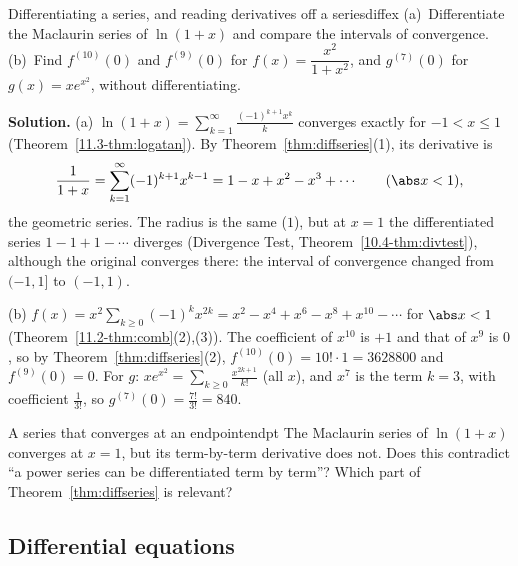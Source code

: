 \documentclass[11pt]{article}
\begin{document}
\begin{exmp}{Differentiating a series, and reading derivatives off a series}{diffex}
(a)~Differentiate the Maclaurin series of $\ln(1+x)$ and compare the intervals of convergence. (b)~Find $f^{(10)}(0)$ and $f^{(9)}(0)$ for $f(x)=\dfrac{x^2}{1+x^2}$, and $g^{(7)}(0)$ for $g(x)=xe^{x^2}$, without differentiating.

\textbf{Solution.} (a) $\ln(1+x)=\sum_{k=1}^\infty\frac{(-1)^{k+1}x^k}k$ converges exactly for $-1<x\le1$ (Theorem~\ref{11.3-thm:logatan}). By Theorem~\ref{thm:diffseries}(1), its derivative is
\[
\frac1{1+x}=\sum_{k=1}^\infty(-1)^{k+1}x^{k-1}=1-x+x^2-x^3+\cdots\qquad(\abs x<1),
\]
the geometric series. The radius is the same ($1$), but at $x=1$ the differentiated series $1-1+1-\cdots$ diverges (Divergence Test, Theorem~\ref{10.4-thm:divtest}), although the original converges there: the interval of convergence changed from $(-1,1]$ to $(-1,1)$.

(b) $f(x)=x^2\sum_{k\ge0}(-1)^kx^{2k}=x^2-x^4+x^6-x^8+x^{10}-\cdots$ for $\abs x<1$ (Theorem~\ref{11.2-thm:comb}(2),(3)). The coefficient of $x^{10}$ is $+1$ and that of $x^9$ is $0$, so by Theorem~\ref{thm:diffseries}(2), $f^{(10)}(0)=10!\cdot1=3628800$ and $f^{(9)}(0)=0$. For $g$: $xe^{x^2}=\sum_{k\ge0}\frac{x^{2k+1}}{k!}$ (all $x$), and $x^7$ is the term $k=3$, with coefficient $\frac1{3!}$, so $g^{(7)}(0)=\frac{7!}{3!}=840$.
\end{exmp}

\begin{think}{A series that converges at an endpoint}{endpt}
The Maclaurin series of $\ln(1+x)$ converges at $x=1$, but its term-by-term derivative does not. Does this contradict ``a power series can be differentiated term by term''? Which part of Theorem~\ref{thm:diffseries} is relevant?
\end{think}

\subsection*{Differential equations}
\end{document}
